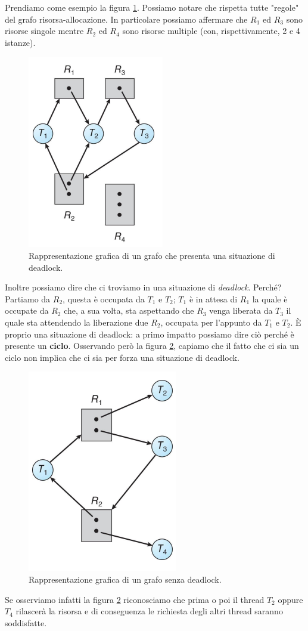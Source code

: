 Prendiamo come esempio la figura \ref{fig:grafo_deadlock}. Possiamo notare che rispetta tutte "regole" del grafo risorsa-allocazione. In particolare possiamo affermare che $R_1$ ed $R_3$ sono risorse singole mentre $R_2$ ed $R_4$ sono risorse multiple (con, rispettivamente, 2 e 4 istanze).
\begin{figure}[h]
    \centering
    \includegraphics[width = .35 \textwidth]{../res/imgs/deadlocks/deadlock_graph.png}
    \caption{Rappresentazione grafica di un grafo che presenta una situazione di deadlock.}
    \label{fig:grafo_deadlock}
\end{figure}
Inoltre possiamo dire che ci troviamo in una situazione di \textit{deadlock}. Perché? Partiamo da $R_2$, questa è occupata da $T_1$ e $T_2$; $T_1$ è in attesa di $R_1$ la quale è occupate da $R_2$ che, a sua volta, sta aspettando che $R_3$ venga liberata da $T_3$ il quale sta attendendo la liberazione due $R_2$, occupata per l'appunto da $T_1$ e $T_2$. È proprio una situazione di deadlock: a primo impatto possiamo dire ciò perché è presente un \textbf{ciclo}. Osservando però la figura \ref{fig:grafo_no_deadlock}, capiamo che il fatto che ci sia un ciclo non implica che ci sia per forza una situazione di deadlock.
\begin{figure}[h]
    \centering
    \includegraphics[width = .35\textwidth]{../res/imgs/deadlocks/no_deadlock_graph.png}
    \caption{Rappresentazione grafica di un grafo senza deadlock.}
    \label{fig:grafo_no_deadlock}
\end{figure}
Se osserviamo infatti la figura \ref{fig:grafo_no_deadlock} riconosciamo che prima o poi il thread $T_2$ oppure $T_4$ rilascerà la risorsa e di conseguenza le richiesta degli altri thread saranno soddisfatte.

